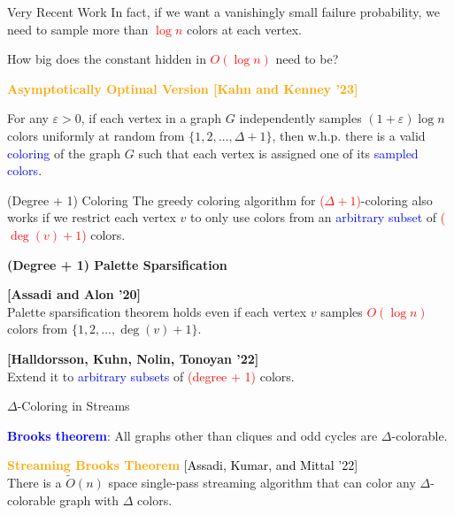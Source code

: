 \documentclass[aspectratio=169,xcolor=dvipsnames]{beamer}
\begin{document}
	\begin{frame}{Very Recent Work}
		\vspace{0.2cm}
		In fact, if we want a vanishingly small failure probability, we need to sample more than \textcolor{red}{\(\log n\)} colors at each vertex.
		
		\vspace{0.3cm}
		How big does the constant hidden in \textcolor{red}{\(O(\log n)\)} need to be?
		
		\vspace{0.6cm}
		\textbf{\textcolor{orange}{Asymptotically Optimal Version [Kahn and Kenney '23]}}
		
		\vspace{0.3cm}
		For any \(\varepsilon > 0\), if each vertex in a graph \(G\) independently samples \((1 + \varepsilon)\log n\) colors uniformly at random from \(\{1, 2, \ldots, \Delta + 1\}\), then w.h.p. there is a valid \textcolor{blue}{coloring} of the graph \(G\) such that each vertex is assigned one of its \textcolor{blue}{sampled colors}.
	\end{frame}
	
	\begin{frame}{(Degree + 1) Coloring}
		\vspace{0.2cm}
		The greedy coloring algorithm for \textcolor{red}{(\(\Delta+1\))}-coloring also works if we restrict each vertex \(v\) to only use colors from an \textcolor{blue}{arbitrary subset} of \textcolor{red}{(\(\deg(v) + 1\))} colors.
		
		\vspace{0.6cm}
		\textbf{(Degree + 1) Palette Sparsification}
		
		\vspace{0.2cm}
		\textbf{[Assadi and Alon '20]}\\
		\vspace{0.4cm}
		Palette sparsification theorem holds even if each  vertex \(v\) samples \textcolor{red}{\(O(\log n)\)} colors from \(\{1, 2, \ldots, \deg(v)+1\}\).
		
		\vspace{0.4cm}
		\textbf{[Halldorsson, Kuhn, Nolin, Tonoyan '22]}\\
		Extend it to \textcolor{blue}{arbitrary subsets} of \textcolor{red}{(degree + 1)} colors.
	\end{frame}
	
	\begin{frame}{\(\Delta\)-Coloring in Streams}
		
		\textbf{\textcolor{blue}{Brooks theorem}}: All graphs other than cliques and odd cycles are \(\Delta\)-colorable.
		
		\vspace{1em}
		
		\textbf{\textcolor{orange}{Streaming Brooks Theorem}} \textcolor{black}{[Assadi, Kumar, and Mittal '22]}\\
		There is a \(\tilde{O}(n)\) space single-pass streaming algorithm that can color any \(\Delta\)-colorable graph with \(\Delta\) colors.
		
	\end{frame}
	
\end{document}
